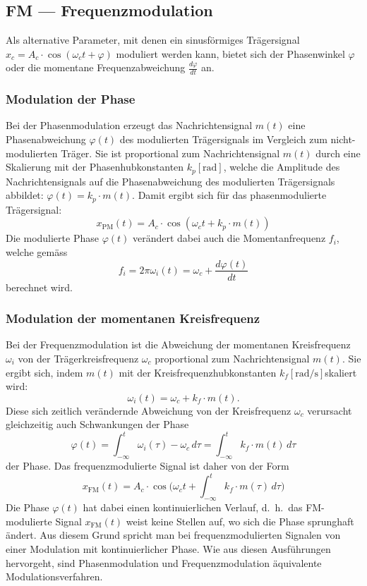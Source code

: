 %
%
%
\subsection{FM --- Frequenzmodulation
\label{fm:section:teil1}}
Als alternative Parameter, mit denen ein sinusförmiges Trägersignal
\(x_c = A_c \cdot \cos(\omega_c t + \varphi)\) moduliert werden kann,
bietet sich der Phasenwinkel
\(\varphi\)
oder die momentane Frequenzabweichung \(\frac{d\varphi}{dt}\) an.

\subsubsection{Modulation der Phase}
Bei der Phasenmodulation erzeugt das
Nachrichtensignal \(m(t)\) eine Phasenabweichung \(\varphi(t)\)
des modulierten Trägersignals im Vergleich zum nicht-modulierten Träger.
Sie ist proportional zum Nachrichtensignal \(m(t)\) durch eine Skalierung
mit der Phasenhubkonstanten 
\(k_p [\text{rad}]\),
welche die Amplitude des Nachrichtensignals auf die Phasenabweichung des
modulierten Trägersignals abbildet: \(\varphi(t) = k_p \cdot m(t)\).
Damit ergibt sich für das phasenmodulierte Trägersignal:
\[
x_{\text{PM}} (t) = A_c \cdot \cos (\omega_c t + k_p \cdot m(t))
\]
Die modulierte Phase \(\varphi(t)\) verändert dabei auch die
Momentanfrequenz \(f_i\), welche gemäss
\[
f_i = 2\pi \omega_i (t) = \omega_c + \frac{d\varphi(t)}{dt}
\]
berechnet wird.

\subsubsection{Modulation der momentanen Kreisfrequenz}
Bei der Frequenzmodulation ist die Abweichung der momentanen
Kreisfrequenz \(\omega_i\) von der Trägerkreisfrequenz \(\omega_c\)
proportional zum Nachrichtensignal \(m(t)\).
Sie ergibt sich, indem \(m(t)\) mit der Kreisfrequenzhubkonstanten
\(k_f [\text{rad/s}] \)skaliert wird: 
\[
\omega_i (t) = \omega_c + k_f \cdot m(t).
\]
Diese sich zeitlich verändernde Abweichung von der Kreisfrequenz \(\omega_c\)
verursacht gleichzeitig auch Schwankungen der Phase
\[
\varphi (t)
=
\int_{-\infty}^t \omega_i (\tau ) - \omega_c\, d\tau
=
\int_{-\infty}^t k_f \cdot m(t)\,d\tau
\]
der Phase.
Das frequenzmodulierte Signal ist daher von der Form
\[
x_{\text{FM}} (t)
=
A_c \cdot
\cos \biggl(
\omega_c t +  \int_{-\infty}^t k_f  \cdot m ( \tau) \,d\tau
\biggr) 
\]
Die Phase \(\varphi(t)\) hat dabei einen kontinuierlichen Verlauf,
d.~h.~das FM-modulierte Signal \(x_{\text{FM}}(t)\) weist keine Stellen
auf, wo sich die Phase sprunghaft ändert.
Aus diesem Grund spricht man bei frequenzmodulierten Signalen 
von einer Modulation mit kontinuierlicher Phase.
Wie aus diesen Ausführungen hervorgeht, sind Phasenmodulation und
Frequenzmodulation äquivalente Modulationsverfahren.


